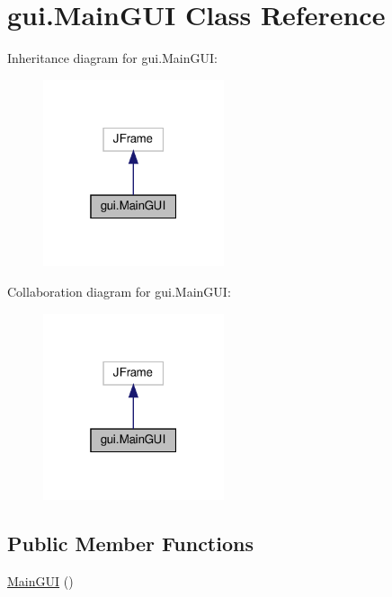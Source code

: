 \hypertarget{classgui_1_1_main_g_u_i}{}\section{gui.\+Main\+G\+UI Class Reference}
\label{classgui_1_1_main_g_u_i}


Inheritance diagram for gui.\+Main\+G\+UI\+:
\nopagebreak
\begin{figure}[H]
\begin{center}
\leavevmode
\includegraphics[width=151pt]{classgui_1_1_main_g_u_i__inherit__graph}
\end{center}
\end{figure}


Collaboration diagram for gui.\+Main\+G\+UI\+:
\nopagebreak
\begin{figure}[H]
\begin{center}
\leavevmode
\includegraphics[width=151pt]{classgui_1_1_main_g_u_i__coll__graph}
\end{center}
\end{figure}
\subsection*{Public Member Functions}
\begin{DoxyCompactItemize}
\item 
\mbox{\hyperlink{classgui_1_1_main_g_u_i_a6968ef45452fe10bd544a46d6e099c32}{Main\+G\+UI}} ()
\end{DoxyCompactItemize}
